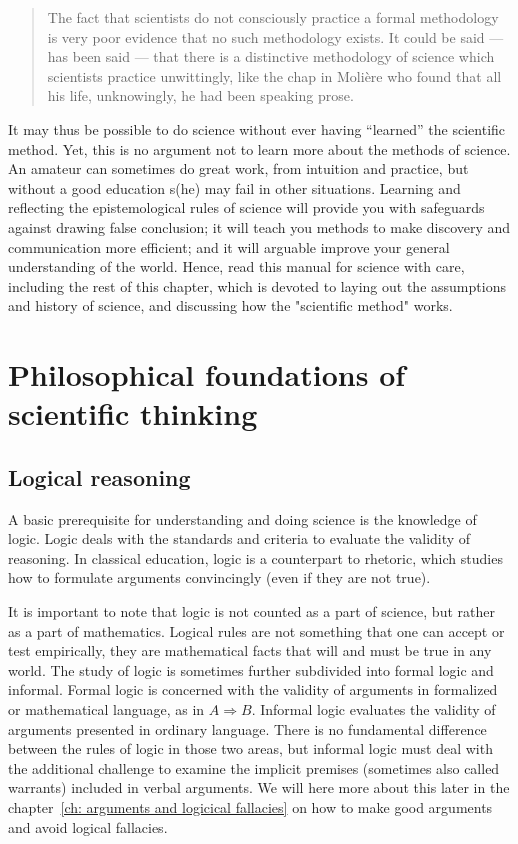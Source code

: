 \documentclass{tufte-book}
\begin{document}
\begin{quote}
The fact that scientists do not consciously practice a formal methodology is very poor evidence that no such methodology exists. It could be said — has been said — that there is a distinctive methodology of science which scientists practice unwittingly, like the chap in Molière who found that all his life, unknowingly, he had been speaking prose.
\end{quote}

It may thus be possible to do science without ever having ``learned'' the scientific method. Yet, this is no argument not to learn more about the methods of science. An amateur can sometimes do great work, from intuition and practice, but without a good education s(he) may fail in other situations. Learning and reflecting the epistemological rules of science will provide you with safeguards against drawing false conclusion; it will teach you methods to make discovery and communication more efficient; and it will arguable improve your general understanding of the world. Hence, read this manual for science with care, including the  rest of this chapter, which is devoted to laying out the assumptions and history of science, and discussing how the "scientific method" works.


\section{Philosophical foundations of scientific thinking}


\subsection{Logical reasoning}

A basic prerequisite for understanding and doing science is the knowledge of logic. Logic deals with the standards and criteria to evaluate the validity of reasoning. In classical education, logic is a counterpart to rhetoric, which studies how to formulate arguments convincingly (even if they are not true).

It is important to note that logic is not counted as a part of science, but rather as a part of mathematics. Logical rules are not something that one can accept or test empirically, they are mathematical facts that will and must be true in any world. The study of logic is sometimes further subdivided into formal logic and informal. Formal logic is concerned with the validity of arguments in formalized or mathematical language, as in $A\Rightarrow B$. Informal logic evaluates the validity of arguments presented in ordinary language. There is no fundamental difference between the rules of logic in those two areas, but informal logic must deal with the additional challenge to examine the implicit premises (sometimes also called warrants) included in verbal arguments. We will here more about this later in the chapter~\ref{ch: arguments and logicical fallacies} on how to make good arguments and avoid logical fallacies.
\end{document}
